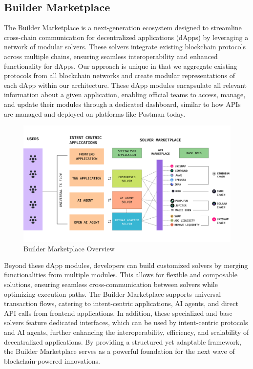 \subsection{Builder Marketplace}
The Builder Marketplace is a next-generation ecosystem designed to streamline cross-chain communication for decentralized applications (dApps) by leveraging a network of modular solvers. These solvers integrate existing blockchain protocols across multiple chains, ensuring seamless interoperability and enhanced functionality for dApps. Our approach is unique in that we aggregate existing protocols from all blockchain networks and create modular representations of each dApp within our architecture. These dApp modules encapsulate all relevant information about a given application, enabling official teams to access, manage, and update their modules through a dedicated dashboard, similar to how APIs are managed and deployed on platforms like Postman today.

\begin{figure}[h]
    \centering
    \includegraphics[width=0.9\linewidth]{figure/builder.png}
    \caption{Builder Marketplace Overview}
    \label{fig:builder}
\end{figure}

Beyond these dApp modules, developers can build customized solvers by merging functionalities from multiple modules. This allows for flexible and composable solutions, ensuring seamless cross-communication between solvers while optimizing execution paths. The Builder Marketplace supports universal transaction flows, catering to intent-centric applications, AI agents, and direct API calls from frontend applications. In addition, these specialized and base solvers feature dedicated interfaces, which can be used by intent-centric protocols and AI agents, further enhancing the interoperability, efficiency, and scalability of decentralized applications. By providing a structured yet adaptable framework, the Builder Marketplace serves as a powerful foundation for the next wave of blockchain-powered innovations.

